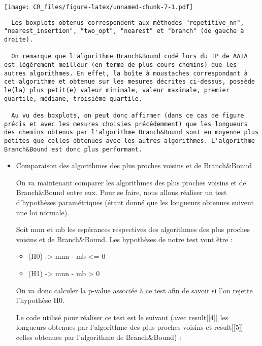 \documentclass[
]{article}
\providecommand{\tightlist}{%
  \setlength{\itemsep}{0pt}\setlength{\parskip}{0pt}}
\begin{document}
\texttt{[image: CR\_files/figure-latex/unnamed-chunk-7-1.pdf]}

\begin{verbatim}
  Les boxplots obtenus correspondent aux méthodes "repetitive_nn", "nearest_insertion", "two_opt", "nearest" et "branch" (de gauche à droite).

  On remarque que l'algorithme Branch&Bound codé lors du TP de AAIA est légèrement meilleur (en terme de plus cours chemins) que les autres algorithmes. En effet, la boîte à moustaches correspondant à cet algorithme et obtenue sur les mesures décrites ci-dessus, possède le(la) plus petit(e) valeur minimale, valeur maximale, premier quartile, médiane, troisième quartile.

  Au vu des boxplots, on peut donc affirmer (dans ce cas de figure précis et avec les mesures choisies précédemment) que les longueurs des chemins obtenus par l'algorithme Branch&Bound sont en moyenne plus petites que celles obtenues avec les autres algorithmes. L'algorithme Branch&Bound est donc plus performant.
\end{verbatim}

\begin{itemize}
\item
  Comparaison des algorithmes des plus proches voisins et de
  Branch\&Bound

  On va maintenant comparer les algorithmes des plus proches voisins et
  de Branch\&Bound entre eux. Pour se faire, nous allons réaliser un
  test d'hypothèses paramétriques (étant donné que les longueurs
  obtenues suivent une loi normale).

  Soit mnn et mb les espérances respectives des algorithmes des plus
  proches voisins et de Branch\&Bound. Les hypothèses de notre test vont
  être :

  \begin{itemize}
  \tightlist
  \item
    (H0) -\textgreater{} mnn - mb \textless= 0
  \item
    (H1) -\textgreater{} mnn - mb \textgreater{} 0
  \end{itemize}

  On va donc calculer la p-value associée à ce test afin de savoir si
  l'on rejette l'hypothèse H0.

  Le code utilisé pour réaliser ce test est le suivant (avec
  result{[}{[}4{]}{]} les longueurs obtenues par l'algorithme des plus
  proches voisins et result{[}{[}5{]}{]} celles obtenues par
  l'algorithme de Branch\&Bound) :
\end{itemize}
\end{document}
